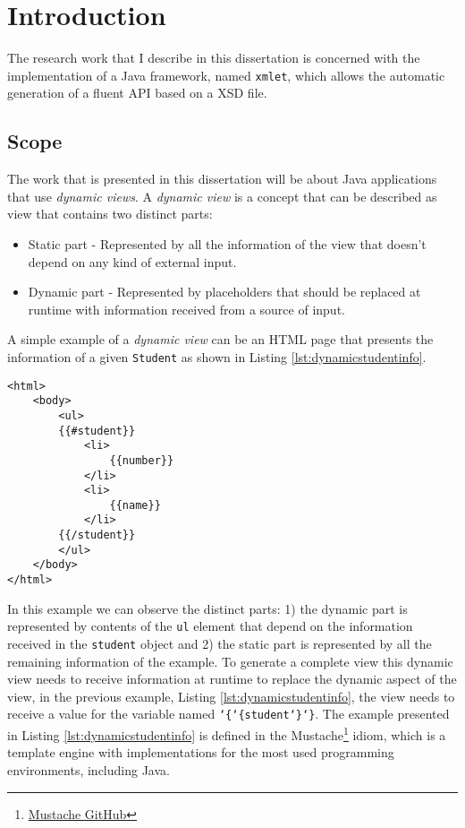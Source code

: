 \chapter{Introduction}
\label{cha:introduction}

The research work that I describe in this dissertation is concerned with the implementation of a Java framework, named \texttt{xmlet}, which allows the automatic generation of a fluent \ac{API} based on a \ac{XSD} file. 

\section{Scope}

The work that is presented in this dissertation will be about Java applications that use \textit{dynamic views}. A \textit{dynamic view} is a concept that can be described as view that contains two distinct parts:

\begin{itemize}
	\item Static part - Represented by all the information of the view that doesn't depend on any kind of external input.
	\item Dynamic part - Represented by placeholders that should be replaced at runtime with information received from a source of input.
\end{itemize} 

\noindent
A simple example of a \textit{dynamic view} can be an \ac{HTML} page that presents the information of a given \texttt{Student} as shown in Listing \ref{lst:dynamicstudentinfo}. 

\lstset{language=html}

\begin{minipage}{\linewidth}
\begin{lstlisting}[caption={Dynamic Student Info}, label={lst:dynamicstudentinfo}]
<html>
    <body>
        <ul>		     
        {{#student}}
            <li>
                {{number}}
            </li>
            <li>
                {{name}}
            </li>
        {{/student}}
        </ul>
    </body>
</html>
\end{lstlisting}
\end{minipage} 

\noindent
In this example we can observe the distinct parts: 1) the dynamic part is represented by contents of the \texttt{ul} element that depend on the information received in the \texttt{student} object and 2) the static part is represented by all the remaining information of the example. To generate a complete view this dynamic view needs to receive information at runtime to replace the dynamic aspect of the view, in the previous example, Listing \ref{lst:dynamicstudentinfo}, the view needs to receive a value for the variable named \texttt{\char`\{\char`\{student\char`\}\char`\}}. The example presented in Listing \ref{lst:dynamicstudentinfo} is defined in the Mustache\footnote{\href{https://mustache.github.io/}{Mustache GitHub}} idiom, which is a template engine with implementations for the most used programming environments, including Java.


